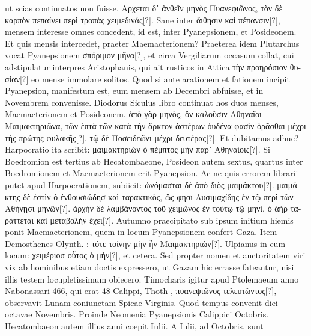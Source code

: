  ut scias continuatos non fuisse.
\textgreek{Αρχεται δ᾽ ἀνθεῖν μηνὸς Πυανεφιῶνος,
 τὸν δὲ καρπὸν πεπαίνει περὶ τροπὰς χειμεδινάς[?]}.
%
Sane inter \textgreek{ἄιθησιν καὶ πέπανσιν[?]},
 mensem interesse omnes concedent,
id est, inter Pyanepsionem, et Posideonem.
Et quis mensis intercedet,
praeter Maemacterionem?
Praeterea idem Plutarchus vocat
Pyanepsionem \textgreek{σπόριμον μῆνα[?]}, et circa Vergiliarum occasum collat,
cui adstipulatur interpres Aristophanis, qui ait rusticos in Attica
 \textgreek{τὴν
προηρόσιον θυσίαν[?]}
eo mense immolare solitos.
Quod si ante arationem
et fationem incipit Pyanepsion, manifestum est, eum mensem ab Decembri
abfuisse, et in Novembrem convenisse.
Diodorus Siculus libro
 continuat hos duos menses, Maemacterionem et Posideonem.
\textgreek{ἀπὸ γὰρ μηνὸς, ὃν καλοῦσιν Αθηναῖοι Μαιμακτηριῶνα,
 τῶν ἑπτὰ τῶν κατὰ τὴν
ἄρκτον ἀστέρων ὀυδένα φασὶν ὁρᾶσθαι μέχρι τὴς πρώτης φυλακῆς[?]}.
\textgreek{τῷ δὲ Ποσειδεῶνι
μέχρι δευτέρας[?]}.
Et dubitamus adhuc?
Harpocratio ita scribit: \textgreek{μαιμακτηριὼν
ὁ πέμπτος μὴν παρ᾽ Αθηναίοις[?]}.
Si Boedromion est tertius ab Hecatombaeone,
Posideon autem sextus, quartus inter Boedromionem
et Maemacterionem erit Pyanepsion.
Ac ne quis errorem librarii
putet apud Harpocrationem, subiicit:
 \textgreek{ὠνόμασται δὲ ἀπὸ διὸς μαιμάκτου[?]}.
\textgreek{μαιμάκτης δὲ ἐστὶν ὁ ἐνθουσιώδησ καὶ ταρακτικὸς,
 ὥς φησι Λυσιμαχίδης
ἐν τῷ περὶ τῶν Αθήνῃσι μηνῶν[?]}.
\textgreek{ἀρχὴν δὲ λαμβάνοντος τοῦ χειμῶνος ἐν τούτῳ
τῷ μηνὶ, ὁ ἀὴρ ταράττεται καὶ μεταβολὴν ἔχει[?]}.
Autumno praecipitato sub
ipsum initium hiemis ponit Maemacterionem, quem in locum Pyanepsionem
confert Gaza.
Item Demosthenes Olynth. : \textgreek{τότε τοίνην
μὴν ἦν Μαιμακτηριὼν[?]}.
Ulpianus in eum locum: \textgreek{χειμέριοσ οὗτος ὁ
μήν[?]}, et cetera.
Sed propter nomen et auctoritatem viri vix ab hominibus
etiam doctis expressero, ut Gazam hic errasse fateantur, nisi
illis testem locupletissimum obiecero.
Timocharis igitur apud Ptolemaeum
anno Nabonassari 466, qui erat 48 Calippi, Thoth ,
\textgreek{πυανεψιῶνος  τελευτῶντος[?]},
 observavit Lunam coniunctam Spicae Virginis.
Quod tempus convenit diei octavae Novembris.
Proinde Neomenia
Pyanepsionis Calippici  Octobris.
Hecatombaeon autem
illius anni coepit  Iulii.
A  Iulii, ad  Octobris, sunt
